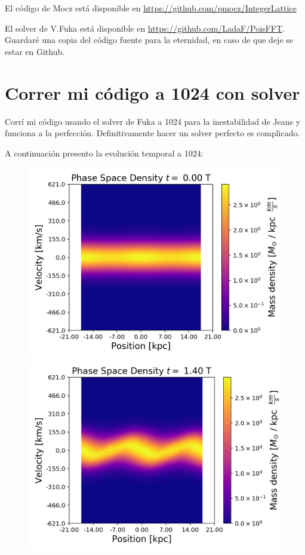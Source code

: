\documentclass[notitlepage,letterpaper,12pt]{article} %
\begin{document}
El código de Mocz está disponible en \url{https://github.com/pmocz/IntegerLattice}

El solver de V.Fuka está disponible en \url{https://github.com/LadaF/PoisFFT}.
Guardaré una copia del código fuente para la eternidad, en caso de que deje se estar en Github.

\section{Correr mi código a 1024 con solver}
Corrí mi código usando el solver de Fuka a 1024 para la inestabilidad de Jeans y funciona a la perfección. Definitivamente hacer un solver perfecto es complicado.

A continuación presento la evolución temporal a 1024:

\begin{figure}[h]
  \centering
   \includegraphics[scale= 0.5]{y1024phase0.png}
      \includegraphics[scale= 0.5]{y1024phase14.png}

\end{figure}
\end{document}
